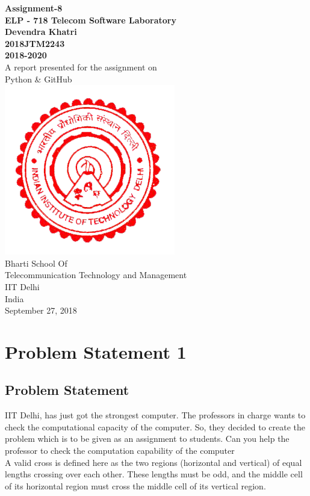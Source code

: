 \documentclass[a4paper,12pt]{article}
\begin{document}
\begin{center}
\textbf{Assignment-8 \\
\bigskip
ELP - 718 Telecom Software Laboratory \\
\smallskip
Devendra Khatri \\
2018JTM2243 \\
2018-2020} \\
\vspace{10mm}
A report presented for the assignment on \\
Python \& GitHub\\
\vspace{30mm}
\includegraphics[scale=0.5]{logo} \\
\vspace{10mm}
Bharti School Of \\
Telecommunication Technology and Management \\
IIT Delhi \\
India \\
September 27, 2018
\end{center}
\newpage
\tableofcontents
\newpage
\listoffigures
\newpage

\section{Problem Statement 1}
\subsection{Problem Statement}
\cite{d1}
IIT Delhi, has just got the strongest computer. The professors in charge wants to check the computational capacity of the computer. So, they decided to create the problem which is to be given as an assignment to students. Can you help the professor to check the computation capability of the computer\\
A valid cross is defined here as the two regions (horizontal and vertical) of equal lengths crossing over each other. These lengths must be odd, and the middle cell of its horizontal region must cross the middle cell of its vertical region.
\vspace{1cm}
\end{document}
